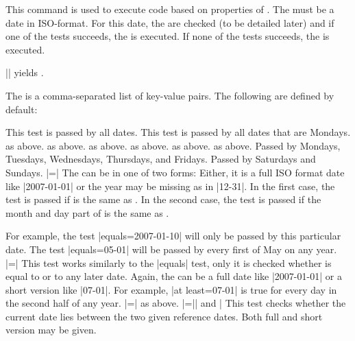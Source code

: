 \begin{command}{\pgfcalendarifdate{}}
  \label{pgfcalendarifdate}
  This command is used to execute code based on properties of
  . The  must be a date in ISO-format. For
  this date, the  are checked (to be detailed later)
  and if one of the tests succeeds, the  is
  executed. If none of the tests succeeds, the  is
  executed.

  \example ||
  yields \texttt{}.

  The  is a comma-separated list of key-value
  pairs. The following are defined by default:
  \begin{itemize}
   This test is passed by all dates.
   This test is passed by all dates that
  are Mondays.
   as above.
   as above.
   as above.
   as above.
   as above.
   as above.
   Passed by Mondays, Tuesdays,
  Wednesdays, Thursdays, and Fridays.
   Passed by Saturdays and Sundays.
  |=| The 
  can be in one of two forms: Either, it is a full ISO format date
  like |2007-01-01| or the year may be missing as in |12-31|. In the
  first case, the test is passed if  is the same as
  . In the second case, the test is passed if the
  month and day part of  is the same as .

  For example, the test |equals=2007-01-10| will only be passed by this
  particular date. The test |equals=05-01| will be passed by every first
  of May on any year.
  |=| This test works
  similarly to the |equals| test, only it is checked whether
   is equal to  or to any later
  date. Again, the  can be a full date like
  |2007-01-01| or a short version like |07-01|. For example,
  |at least=07-01| is true for every day in the second half of any
  year.
  |=| as above.
  |=|| and | This test checks whether the current date lies between
  the two given reference dates. Both full and short version may be
  given.


\end{itemize}
\end{command}
